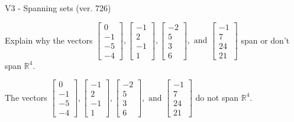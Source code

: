 \begin{exercise}
  \begin{exerciseTitle}V3 - Spanning sets (ver. 726)\end{exerciseTitle}
  \begin{exerciseStatement}
    Explain why the vectors \(\left[\begin{array}{r}
0 \\
-1 \\
-5 \\
-4
\end{array}\right] , \left[\begin{array}{r}
-1 \\
2 \\
-1 \\
1
\end{array}\right] , \left[\begin{array}{r}
-2 \\
5 \\
3 \\
6
\end{array}\right] , \text{ and } \left[\begin{array}{r}
-1 \\
7 \\
24 \\
21
\end{array}\right]\) span or don't span \(\mathbb{R}^4\). 
	


  \end{exerciseStatement}
  \begin{exerciseAnswer}
   The vectors \(\left[\begin{array}{r}
0 \\
-1 \\
-5 \\
-4
\end{array}\right] , \left[\begin{array}{r}
-1 \\
2 \\
-1 \\
1
\end{array}\right] , \left[\begin{array}{r}
-2 \\
5 \\
3 \\
6
\end{array}\right] , \text{ and } \left[\begin{array}{r}
-1 \\
7 \\
24 \\
21
\end{array}\right]\) 
  	 do not  
	span \(\mathbb{R}^4\).
  


  \end{exerciseAnswer}
\end{exercise}